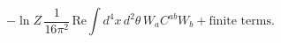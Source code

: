 \begin{equation}\label{1PI_With_Counterterms}
- \ln Z\,\frac{1}{16\pi^2}\,
\mbox{Re}\int d^4x\,d^2\theta\,W_a C^{ab} W_b +\mbox{finite terms}.
\end{equation}

